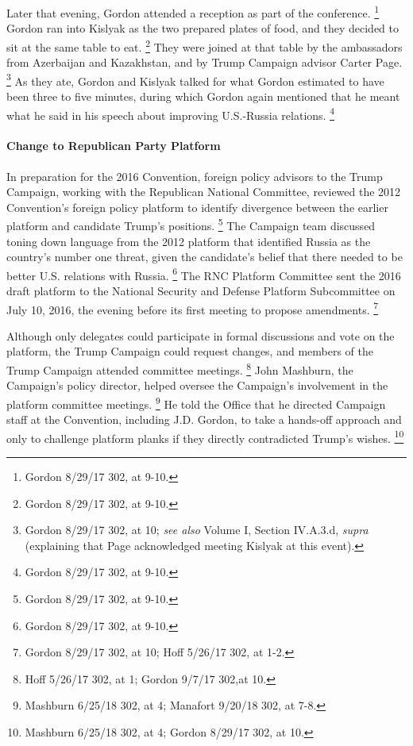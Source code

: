 Later that evening, Gordon attended a reception as part of the conference.%
\footnote{Gordon 8/29/17 302, at 9-10.}
Gordon ran into Kislyak as the two prepared plates of food, and they decided to sit at the same table to eat.%
\footnote{Gordon 8/29/17 302, at 9-10.}
They were joined at that table by the ambassadors from Azerbaijan and Kazakhstan, and by Trump Campaign advisor Carter Page.%
\footnote{Gordon 8/29/17 302, at 10;
\textit{see also} Volume I, Section IV.A.3.d, \textit{supra} (explaining that Page acknowledged meeting Kislyak at this event).
}
As they ate, Gordon and Kislyak talked for what Gordon estimated to have been three to five minutes, during which Gordon again mentioned that he meant what he said in his speech about improving U.S.-Russia relations.%
\footnote{Gordon 8/29/17 302, at 9-10.}

\paragraph{Change to Republican Party Platform}

In preparation for the 2016 Convention, foreign policy advisors to the Trump Campaign, working with the Republican National Committee, reviewed the 2012 Convention's foreign policy platform to identify divergence between the earlier platform and candidate Trump's positions.%
\footnote{Gordon 8/29/17 302, at 9-10.}
The Campaign team discussed toning down language from the 2012 platform that identified Russia as the country's number one threat, given the candidate's belief that there needed to be better U.S. relations with Russia.%
\footnote{Gordon 8/29/17 302, at 9-10.}
The RNC Platform Committee sent the 2016 draft platform to the National Security and Defense Platform Subcommittee on July 10, 2016, the evening before its first meeting to propose amendments.%
\footnote{Gordon 8/29/17 302, at 10;
Hoff 5/26/17 302, at 1-2.}

Although only delegates could participate in formal discussions and vote on the platform, the Trump Campaign could request changes, and members of the Trump Campaign attended committee meetings.%
\footnote{Hoff 5/26/17 302, at 1;
Gordon 9/7/17 302,at 10.}
John Mashburn, the Campaign's policy director, helped oversee the Campaign's involvement in the platform committee meetings.%
\footnote{Mashburn 6/25/18 302, at 4;
Manafort 9/20/18 302, at 7-8.}
He told the Office that he directed Campaign staff at the Convention, including J.D. Gordon, to take a hands-off approach and only to challenge platform planks if they directly contradicted Trump's wishes.%
\footnote{Mashburn 6/25/18 302, at 4;
Gordon 8/29/17 302, at 10.}

